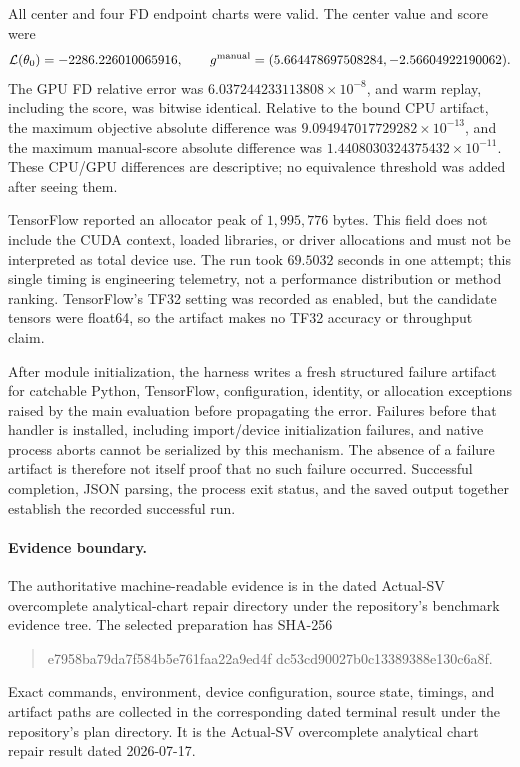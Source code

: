 All center and four FD endpoint charts were valid.  The center value and score
were
\[
  \mathcal L(\theta_0)=-2286.226010065916,\qquad
  g^{\rm manual}=(5.664478697508284,-2.56604922190062).
\]
The GPU FD relative error was \(6.037244233113808\times10^{-8}\), and warm
replay, including the score, was bitwise identical.  Relative to the bound CPU
artifact, the maximum objective absolute difference was
\(9.094947017729282\times10^{-13}\), and the maximum manual-score absolute
difference was \(1.4408030324375432\times10^{-11}\).  These CPU/GPU
differences are descriptive; no equivalence threshold was added after seeing
them.

TensorFlow reported an allocator peak of \(1{,}995{,}776\) bytes.  This field
does not include the CUDA context, loaded libraries, or driver allocations and
must not be interpreted as total device use.  The run took \(69.5032\) seconds
in one attempt; this single timing is engineering telemetry, not a performance
distribution or method ranking.  TensorFlow's TF32 setting was recorded as
enabled, but the candidate tensors were float64, so the artifact makes no TF32
accuracy or throughput claim.

After module initialization, the harness writes a fresh structured failure
artifact for catchable Python, TensorFlow, configuration, identity, or
allocation exceptions raised by the main evaluation before propagating the
error.  Failures before that handler is installed, including import/device
initialization failures, and native process aborts cannot be serialized by this
mechanism.  The absence of a failure artifact is therefore not itself proof
that no such failure occurred.  Successful completion, JSON parsing, the
process exit status, and the saved output together establish the recorded
successful run.

\paragraph{Evidence boundary.}
The authoritative machine-readable evidence is in the dated Actual-SV
overcomplete analytical-chart repair directory under the repository's
benchmark evidence tree.
The selected preparation has SHA-256
\begin{quote}\small\ttfamily
e7958ba79da7f584b5e761faa22a9ed4f\allowbreak
dc53cd90027b0c13389388e130c6a8f.
\end{quote}
Exact commands, environment, device configuration, source state, timings, and
artifact paths are collected in the corresponding dated terminal result under
the repository's plan directory.  It is the Actual-SV overcomplete analytical
chart repair result dated 2026-07-17.

